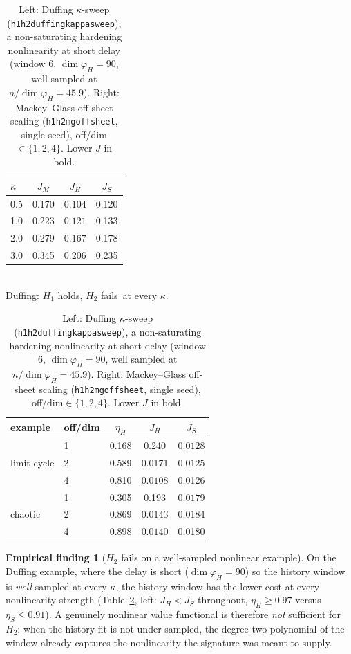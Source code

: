 \documentclass[11pt]{article}
\renewcommand{\_}{\discretionary{\textunderscore}{}{\textunderscore}}
\theoremstyle{plain}
\theoremstyle{definition}
\newtheorem{finding}[theorem]{Empirical finding}
\newcommand{\failsv}{\textcolor{black!55}{fails}}
\begin{document}
\begin{table}[ht]\centering\small
\caption{Left: Duffing $\kappa$-sweep (\texttt{h1h2\_duffing\_kappa\_sweep}), a non-saturating
hardening nonlinearity at short delay (window $6$, $\dim\varphi_H=90$, well sampled at
$n/\dim\varphi_H=45.9$). Right: Mackey--Glass off-sheet scaling
(\texttt{h1h2\_mg\_offsheet}, single seed), off/dim${}\in\{1,2,4\}$. Lower $J$ in bold.}
\label{tab:generality}
\setlength{\tabcolsep}{4pt}
\begin{minipage}[t]{0.49\textwidth}\centering
\begin{tabular}{lccc}
\toprule
$\kappa$ & $J_M$ & $J_H$ & $J_S$\\
\midrule
0.5 & 0.170 & $\mathbf{0.104}$ & 0.120\\
1.0 & 0.223 & $\mathbf{0.121}$ & 0.133\\
2.0 & 0.279 & $\mathbf{0.167}$ & 0.178\\
3.0 & 0.345 & $\mathbf{0.206}$ & 0.235\\
\bottomrule
\end{tabular}\\[2pt]
{\footnotesize Duffing: $H_1$ holds, $H_2$ \failsv\ at every $\kappa$.}
\end{minipage}\hfill
\begin{minipage}[t]{0.49\textwidth}\centering
\begin{tabular}{llccc}
\toprule
example & off/dim & $\eta_H$ & $J_H$ & $J_S$\\
\midrule
\multirow{3}{*}{limit cycle}
 & 1 & 0.168 & 0.240 & $\mathbf{0.0128}$\\
 & 2 & 0.589 & 0.0171 & $\mathbf{0.0125}$\\
 & 4 & 0.810 & $\mathbf{0.0108}$ & 0.0126\\
\midrule
\multirow{3}{*}{chaotic}
 & 1 & 0.305 & 0.193 & $\mathbf{0.0179}$\\
 & 2 & 0.869 & $\mathbf{0.0143}$ & 0.0184\\
 & 4 & 0.898 & $\mathbf{0.0140}$ & 0.0180\\
\bottomrule
\end{tabular}
\end{minipage}
\end{table}

\begin{finding}[$H_2$ fails on a well-sampled nonlinear example]\label{find:duffing}
On the Duffing example, where the delay is short ($\dim\varphi_H=90$) so the history window is
\emph{well} sampled at every $\kappa$, the history window has the lower cost at every
nonlinearity strength (Table~\ref{tab:generality}, left: $J_H<J_S$ throughout, $\eta_H\ge0.97$
versus $\eta_S\le0.91$). A genuinely nonlinear value functional is therefore \emph{not}
sufficient for $H_2$: when the history fit is not under-sampled, the degree-two polynomial of the
window already captures the nonlinearity the signature was meant to supply.
\end{finding}
\end{document}
